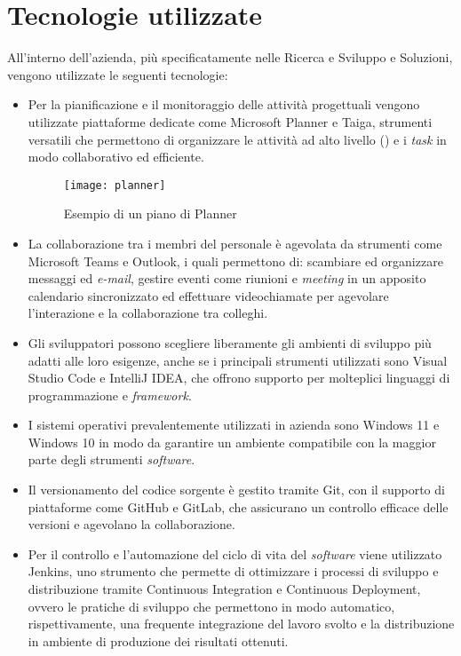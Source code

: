 \section{Tecnologie utilizzate}
All'interno dell'azienda, più specificatamente nelle  Ricerca e Sviluppo e Soluzioni, vengono utilizzate le seguenti tecnologie: 
\begin{itemize}
    \item Per la pianificazione e il monitoraggio delle attività progettuali vengono utilizzate piattaforme dedicate come Microsoft Planner e Taiga, strumenti versatili che permettono di organizzare le attività ad alto livello () e i \emph{task} in modo collaborativo ed efficiente. 
    \begin{figure}[htbp] 
        \centering 
        \texttt{[image: planner]}
        \caption{Esempio di un piano di Planner} 
        \label{fig:planner}
    \end{figure}
    \item La collaborazione tra i membri del personale è agevolata da strumenti come Microsoft Teams e Outlook, i quali permettono di: scambiare ed organizzare messaggi ed \emph{e-mail}, gestire eventi come riunioni e \emph{meeting} in un apposito calendario sincronizzato ed effettuare videochiamate per agevolare l'interazione e la collaborazione tra colleghi. 
    \item Gli sviluppatori possono scegliere liberamente gli ambienti di sviluppo più adatti alle loro esigenze, anche se i principali strumenti utilizzati sono Visual Studio Code e IntelliJ IDEA, che offrono supporto per molteplici linguaggi di programmazione e \emph{framework}. 
    \item I sistemi operativi prevalentemente utilizzati in azienda sono Windows 11 e Windows 10 in modo da garantire un ambiente compatibile con la maggior parte degli strumenti \emph{software}. 
    \item Il versionamento del codice sorgente è gestito tramite Git, con il supporto di piattaforme come GitHub e GitLab, che assicurano un controllo efficace delle versioni e agevolano la collaborazione. 
    \item Per il controllo e l'automazione del ciclo di vita del \emph{software} viene utilizzato Jenkins, uno strumento che permette di ottimizzare i processi di sviluppo e distribuzione tramite \gls{Continuous Integration} e \gls{Continuous Deployment}, ovvero le pratiche di sviluppo che permettono in modo automatico, rispettivamente, una frequente integrazione del lavoro svolto e la distribuzione in ambiente di produzione dei risultati ottenuti. 

\end{itemize}

